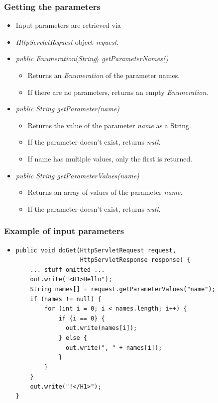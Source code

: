 \documentclass[10pt,xcolor=pdflatex]{beamer}
\begin{document}
\begin{frame}[containsverbatim]\frametitle{Getting the parameters}
\begin{itemize}
	\item Input parameters are retrieved via 
    \item[] \emph{HttpServletRequest} object \emph{request}.
	\item \emph{public Enumeration$\langle$String$\rangle$ getParameterNames()}
	  \begin{itemize}
    	\item Returns an \emph{Enumeration} of the parameter names.
		\item If there are no parameters, returns an empty \emph{Enumeration}.
      \end{itemize}
    \item \emph{public String getParameter(name)}
      \begin{itemize}
    	\item Returns the value of the parameter \emph{name} as a String.
		\item If the parameter doesn’t exist, returns \emph{null}.
		\item If name has multiple values, only the first is returned.
      \end{itemize}
	\item \emph{public String{\selectfont []} getParameterValues(name)}
	\begin{itemize}
    	\item Returns an array of values of the parameter \emph{name}.
		\item If the parameter doesn’t exist, returns \emph{null}.
    \end{itemize}
    \end{itemize}
\end{frame}


\begin{frame}[containsverbatim]\frametitle{Example of input parameters}
\begin{itemize}
	\item[] \begin{footnotesize} \begin{verbatim}
public void doGet(HttpServletRequest request, 
                  HttpServletResponse response) {
    ... stuff omitted ...
    out.write("<H1>Hello");
    String names[] = request.getParameterValues("name");       
    if (names != null) {
        for (int i = 0; i < names.length; i++) {
            if {i == 0} {
              out.write(names[i]);
            } else {
              out.write(", " + names[i]);
            }
        }
    }
    out.write("!</H1>");
}
    \end{verbatim} \end{footnotesize}
\end{itemize}
\end{frame}
\end{document}
